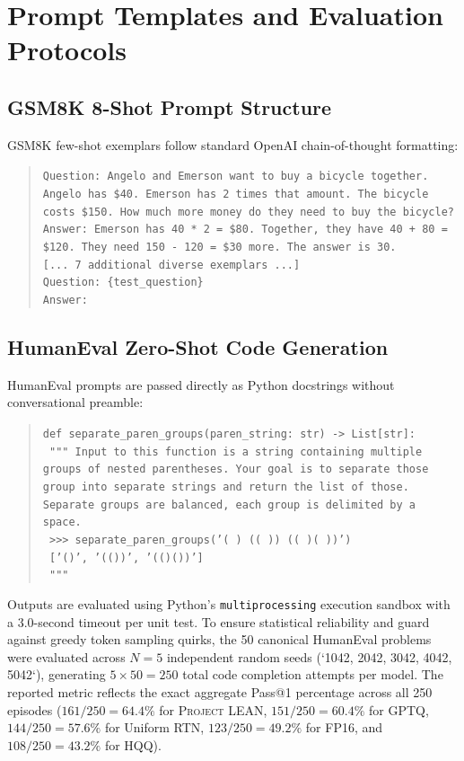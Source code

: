 \documentclass[10pt,twocolumn,letterpaper]{article}
\newcommand{\systemname}{\textsc{Project LEAN}}
\begin{document}
\section{Prompt Templates and Evaluation Protocols}
\label{app:prompts}

\subsection{GSM8K 8-Shot Prompt Structure}
GSM8K few-shot exemplars follow standard OpenAI chain-of-thought formatting:
\begin{quote}
\small
\texttt{Question: Angelo and Emerson want to buy a bicycle together. Angelo has \$40. Emerson has 2 times that amount. The bicycle costs \$150. How much more money do they need to buy the bicycle?}\\
\texttt{Answer: Emerson has 40 * 2 = \$80. Together, they have 40 + 80 = \$120. They need 150 - 120 = \$30 more. The answer is 30.}\\
\texttt{[... 7 additional diverse exemplars ...]}\\
\texttt{Question: \{test\_question\}}\\
\texttt{Answer:}
\end{quote}

\subsection{HumanEval Zero-Shot Code Generation}
HumanEval prompts are passed directly as Python docstrings without conversational preamble:
\begin{quote}
\small
\texttt{def separate\_paren\_groups(paren\_string: str) -> List[str]:}\\
\texttt{    """ Input to this function is a string containing multiple groups of nested parentheses. Your goal is to separate those group into separate strings and return the list of those. Separate groups are balanced, each group is delimited by a space.}\\
\texttt{    >>> separate\_paren\_groups('( ) (( )) (( )( ))')}\\
\texttt{    ['()', '(())', '(()())']}\\
\texttt{    """}
\end{quote}
Outputs are evaluated using Python's \texttt{multiprocessing} execution sandbox with a 3.0-second timeout per unit test. To ensure statistical reliability and guard against greedy token sampling quirks, the 50 canonical HumanEval problems were evaluated across $N=5$ independent random seeds (`1042, 2042, 3042, 4042, 5042`), generating $5 \times 50 = 250$ total code completion attempts per model. The reported metric reflects the exact aggregate Pass@1 percentage across all 250 episodes ($161/250 = 64.4\%$ for \systemname{}, $151/250 = 60.4\%$ for GPTQ, $144/250 = 57.6\%$ for Uniform RTN, $123/250 = 49.2\%$ for FP16, and $108/250 = 43.2\%$ for HQQ).
\end{document}
